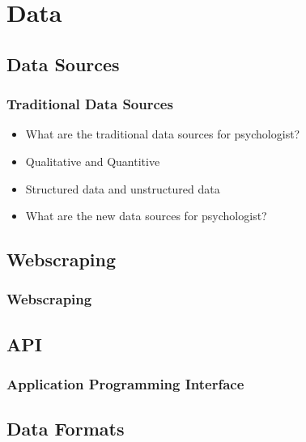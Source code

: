 \section[Data]{Data}

\subsection[Data Sources]{Data Sources}

\begin{frame}
    \frametitle{Traditional Data Sources}
    \begin{itemize}
        \item What are the traditional data sources for psychologist?
        \item Qualitative and Quantitive
        \item Structured data and unstructured data
        \item What are the new data sources for psychologist?
    \end{itemize}
\end{frame}

\subsection{Webscraping}

\begin{frame}
    \frametitle{Webscraping}
\end{frame}

\subsection{API}

\begin{frame}
    \frametitle{Application Programming Interface}
\end{frame}

\subsection[Data Formats]{Data Formats}

